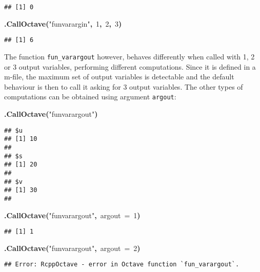 \documentclass[english,10pt,a4paper]{article}\usepackage{graphicx, color}
\makeatletter
\newcommand{\hlnumber}[1]{\textcolor[rgb]{0,0,0}{#1}}%
\newcommand{\hlfunctioncall}[1]{\textcolor[rgb]{0.501960784313725,0,0.329411764705882}{\textbf{#1}}}%
\newcommand{\hlstring}[1]{\textcolor[rgb]{0.6,0.6,1}{#1}}%
\newcommand{\hlkeyword}[1]{\textcolor[rgb]{0,0,0}{\textbf{#1}}}%
\newcommand{\hlargument}[1]{\textcolor[rgb]{0.690196078431373,0.250980392156863,0.0196078431372549}{#1}}%
\newenvironment{kframe}{%
 \def\FrameCommand##1{\hskip\@totalleftmargin \hskip-\fboxsep
 \colorbox{shadecolor}{##1}\hskip-\fboxsep
     \hskip-\linewidth \hskip-\@totalleftmargin \hskip\columnwidth}%
 \MakeFramed {\advance\hsize-\width
   \@totalleftmargin\z@ \linewidth\hsize
   \@setminipage}}%
 {\par\unskip\endMakeFramed}
\newenvironment{knitrout}{}{} %
\let\code=\texttt
\makeatother
\begin{document}
\begin{knitrout}
\begin{kframe}
\begin{flushleft}
\normalfont
\end{flushleft}
\begin{verbatim}
## [1] 0
\end{verbatim}
\begin{flushleft}
\ttfamily\noindent
\hlfunctioncall{.CallOctave}\hlkeyword{(}\hlstring{"{}fun\usebox{\hlnormalsizeboxunderscore}varargin"{}}\hlkeyword{,}{\ }\hlnumber{1}\hlkeyword{,}{\ }\hlnumber{2}\hlkeyword{,}{\ }\hlnumber{3}\hlkeyword{)}\mbox{}
\normalfont
\end{flushleft}
\begin{verbatim}
## [1] 6
\end{verbatim}
\end{kframe}
\end{knitrout}


The function \code{fun\_varargout} however, behaves differently when called
with 1, 2 or 3 output variables, performing different computations.
Since it is defined in a m-file, the maximum set of output variables is
detectable and the default behaviour is then to call it asking for 3 output
variables.
The other types of computations can be obtained using argument \code{argout}:

\begin{knitrout}
\color{fgcolor}\begin{kframe}
\begin{flushleft}
\ttfamily\noindent
\hlfunctioncall{.CallOctave}\hlkeyword{(}\hlstring{"{}fun\usebox{\hlnormalsizeboxunderscore}varargout"{}}\hlkeyword{)}\mbox{}
\normalfont
\end{flushleft}
\begin{verbatim}
## $u
## [1] 10
## 
## $s
## [1] 20
## 
## $v
## [1] 30
## 
\end{verbatim}
\begin{flushleft}
\ttfamily\noindent
\hlfunctioncall{.CallOctave}\hlkeyword{(}\hlstring{"{}fun\usebox{\hlnormalsizeboxunderscore}varargout"{}}\hlkeyword{,}{\ }\hlargument{argout}{\ }\hlargument{=}{\ }\hlnumber{1}\hlkeyword{)}\mbox{}
\normalfont
\end{flushleft}
\begin{verbatim}
## [1] 1
\end{verbatim}
\begin{flushleft}
\ttfamily\noindent
\hlfunctioncall{.CallOctave}\hlkeyword{(}\hlstring{"{}fun\usebox{\hlnormalsizeboxunderscore}varargout"{}}\hlkeyword{,}{\ }\hlargument{argout}{\ }\hlargument{=}{\ }\hlnumber{2}\hlkeyword{)}\mbox{}
\normalfont
\end{flushleft}
\begin{verbatim}
## Error: RcppOctave - error in Octave function `fun_varargout`.
\end{verbatim}
\end{kframe}
\end{knitrout}
\end{document}
